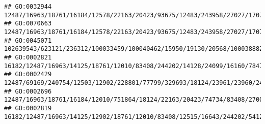 \documentclass[
]{article}
\begin{document}
\begin{verbatim}
## GO:0032944                                                                                                                                                        12487/16963/18761/16184/12578/22163/20423/93675/12483/243958/27027/170786/24099/15930/12501/81897/16160/57916/20304/12775/20533/20666/14165/321019/72049/208154/320484/15000/14999/14960/547431/11629/69816/16149/14419/12511/60533/58205/20371/12229
## GO:0070663                                                                                                                                                  12487/16963/18761/16184/12578/22163/20423/93675/12483/243958/27027/170786/24099/15930/76527/12501/81897/16160/57916/20304/12775/20533/20666/14165/321019/72049/208154/320484/15000/14999/14960/547431/11629/69816/16149/14419/12511/60533/58205/20371/12229
## GO:0045071                                                                                                                                                                                                                                                          102639543/623121/236312/100033459/100040462/15950/19130/20568/100038882/23962/231655/246728/246727/23961/23960/246730/68713/69550/20304/58185/17858
## GO:0002821                                                                                                                                                                                                      16182/12487/16963/14125/18761/12010/83408/244202/14128/24099/16160/78473/58185/72049/14972/14998/21355/15006/15013/15015/110557/15018/68395/110558/15039/100529082/15024/667977/14990/16149/20371/12229
## GO:0002429                                                                                                                                           12487/69169/240754/12503/12902/228801/77799/329693/18124/23961/23960/246730/414084/12526/12525/93675/16643/27007/12518/12483/16797/12478/12501/12047/67596/327957/78473/12775/15985/12143/14293/547431/100038862/632126/624681/74556/12475/12482/20371/20400/12229
## GO:0002696                                                                                                                     12487/16963/18761/16184/12010/751864/18124/22163/20423/74734/83408/27007/16170/24099/17394/12501/81897/67596/16160/20304/12775/20533/14165/21943/321019/72049/320484/15001/14998/15000/14999/15002/14961/14960/14969/381091/547431/11629/16149/12507/12511/60533/58205/20371/16186/12229
## GO:0002819                                                                                                                                                                  16182/12487/16963/14125/12902/18761/12010/83408/12515/16643/244202/54123/14128/24099/16160/78473/12775/58185/72049/14972/14998/21355/15006/15013/15015/110557/15018/68395/110558/15039/100529082/15024/667977/14990/16149/60533/20371/12229

\end{verbatim}
\end{document}
